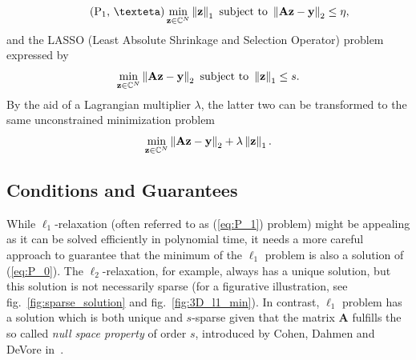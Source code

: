 \begin{equation}
    \tag{P\textsubscript{1}, \texteta}\label{eq:P_1_noisy}
    \min_{\mathbf{z} \in \mathbb{C}^N} \norm{\mathbf{z}}_1 \text{ subject to } \norm{\mathbf{Az} - \mathbf{y}}_2 \le \eta,
\end{equation}
and the LASSO (Least Absolute Shrinkage and Selection Operator) \cite{tibshirani} problem expressed by
\[\min_{\mathbf{z} \in \mathbb{C}^N} \left\lVert\mathbf{Az} - \mathbf{y}\right\rVert_2 \text{ subject to } \left\lVert\mathbf{z}\right\rVert_1 \le s.\]
By the aid of a Lagrangian multiplier $\lambda$, the latter two can be transformed to the same unconstrained minimization problem
\[\min_{\mathbf{z} \in \mathbb{C}^N} \left\lVert\mathbf{Az} - \mathbf{y}\right\rVert_2 + \lambda \left\lVert\mathbf{z}\right\rVert_1.\]

\subsection{Conditions and Guarantees}
While $\ell_1$-relaxation (often referred to as (\ref{eq:P_1}) problem) might be appealing as it can be solved efficiently in polynomial time, it needs a more careful approach to guarantee that the minimum of the $\ell_1$ problem is also a solution of (\ref{eq:P_0}). The $\ell_2$-relaxation, for example, always has a unique solution, but this solution is not necessarily sparse (for a figurative illustration, see fig.~\ref{fig:sparse_solution} and fig.~\ref{fig:3D_l1_min}). In contrast, $\ell_1$ problem has a solution which is both unique and $s$-sparse given that the matrix $\mathbf{A}$ fulfills the so called \textit{null space property} of order $s$, introduced by Cohen, Dahmen and DeVore in~\cite{cohen_compressed_2009}.

